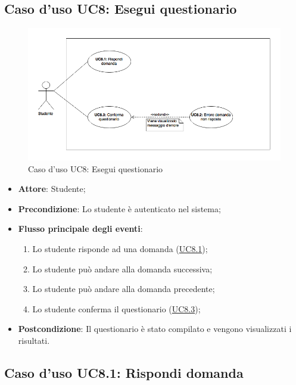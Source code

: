 \documentclass[12pt,a4paper]{article}
\begin{document}
\subsection{Caso d'uso UC8: Esegui questionario}
\begin{figure}[H]
	\centering
	\includegraphics[width=\textwidth]{diagramUC8.png}
	\caption{Caso d'uso UC8: Esegui questionario}\label{fig:UC8} 
\end{figure}
\begin{itemize}

\item \textbf{Attore}: Studente; 
\item \textbf{Precondizione}: Lo studente è autenticato nel sistema;

\item \textbf{Flusso principale degli eventi}:
\begin{enumerate}
	\item Lo studente risponde ad una domanda (\hyperlink{UC8.1}{UC8.1});
	\item Lo studente può andare alla domanda successiva;
	\item Lo studente può andare alla domanda precedente;
	\item Lo studente conferma il questionario (\hyperlink{UC8.3}{UC8.3});
	
\end{enumerate}
\item \textbf{Postcondizione}: Il questionario è stato compilato e vengono visualizzati i risultati.
\end{itemize}
\hypertarget{UC8.1}{}
\subsection{Caso d'uso UC8.1: Rispondi domanda}
\end{document}
